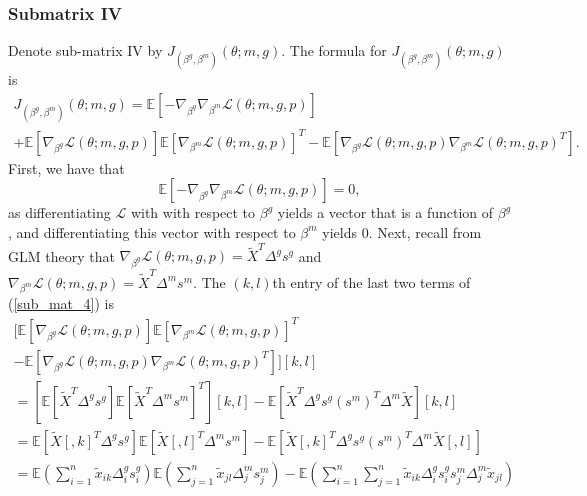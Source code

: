 \documentclass[12pt]{article}
\begin{document}
\begin{appendices}
\begin{refsection}
		\subsubsection*{Submatrix IV}
		Denote sub-matrix IV by $J_{(\beta^g, \beta^m)}(\theta; m, g)$. The formula for $J_{(\beta^g, \beta^m)}(\theta; m, g)$ is 
		\begin{multline}\label{sub_mat_4}
		J_{(\beta^g, \beta^m)}(\theta; m,g) = \mathbb{E} \left[-\nabla_{\beta^g} \nabla_{\beta^m} \mathcal{L}(\theta; m, g, p) \right] \\ + \mathbb{E}\left[ \nabla_{\beta^{g}}\mathcal{L}(\theta ; m,g,p) \right] \mathbb{E} \left[\nabla_{\beta^m}\mathcal{L} (\theta ; m,g,p)  \right]^T - \mathbb{E} \left[ \nabla_{\beta^{g}}\mathcal{L} (\theta; m,g,p) \nabla_{\beta^m}\mathcal{L}(\theta; m,g,p)^T  \right].
		\end{multline}
		First, we have that
		\begin{equation}\label{sub_mat_4_1}
		\mathbb{E}\left[-\nabla_{\beta^g} \nabla_{\beta^m} \mathcal{L}(\theta; m, g, p) \right] = 0,
		\end{equation}
		as differentiating $\mathcal{L}$ with with respect to $\beta^g$ yields a vector that is a function of $\beta^g$, and differentiating this vector with respect to $\beta^m$ yields $0$. Next, recall from GLM theory that $\nabla_{\beta^g} \mathcal{L}(\theta; m, g, p) =   \tilde{X}^T\Delta^g s^g$ and $\nabla_{\beta^m} \mathcal{L}(\theta; m, g, p) = \tilde{X}^T \Delta^m s^m.$ The $(k,l)$th entry of the last two terms of (\ref{sub_mat_4}) is
		\begin{multline}\label{sub_mat_4_2}
		\bigg[ \mathbb{E} \left[\nabla_{\beta^g} \mathcal{L}(\theta; m, g, p) \right] \mathbb{E} \left[\nabla_{\beta^m} \mathcal{L}(\theta; m, g, p) \right]^T \\ - \mathbb{E} \left[ \nabla_{\beta^g} \mathcal{L}(\theta; m, g, p) \nabla_{\beta^m} \mathcal{L}(\theta; m, g, p)^T \right] \bigg][k,l] \\ 
		= \left[ \mathbb{E} \left[ \tilde{X}^T \Delta^g s^g \right]\mathbb{E} \left[ \tilde{X}^T \Delta^m s^m \right]^T\right][k,l] - \mathbb{E} \left[ \tilde{X}^T \Delta^g s^g (s^m)^T \Delta^m \tilde{X} \right][k,l] \\ 
		= \mathbb{E}\left[\tilde{X}[,k]^T \Delta^g s^g \right] \mathbb{E} \left[\tilde{X}[,l]^T \Delta^m s^m \right] - \mathbb{E} \left[\tilde{X}[,k]^T \Delta^g s^g (s^m)^T \Delta^m \tilde{X}[,l ] \right] \\
		=\mathbb{E}\left( \sum_{i=1}^n \tilde{x}_{ik} \Delta^g_i s^g_i \right) \mathbb{E} \left( \sum_{j=1}^n \tilde{x}_{jl} \Delta^m_j s^m_j \right) - \mathbb{E} \left( \sum_{i=1}^n \sum_{j=1}^n \tilde{x}_{ik} \Delta^g_i s^g_i s^m_j \Delta^m_j \tilde{x}_{jl} \right) \\ 

\end{multline}
\end{refsection}
\end{appendices}
\end{document}

